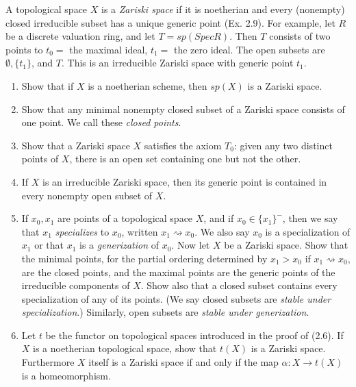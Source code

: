 \begin{exercise}
	A topological space $X$ is a \textit{Zariski space} if it is noetherian and every (nonempty) closed irreducible subset has a unique generic point (Ex. 2.9). For example, let $R$ be a discrete valuation ring, and let $T = sp(Spec R)$. Then $T$ consists of two points to $t_{0} =$ the maximal ideal, $t_1 =$ the zero ideal. The open subsets are $\emptyset, \{t_{1}\}$, and $T$. This is an irreducible Zariski space with generic point $t_1$.
	\begin{enumerate}
		\item Show that if $X$ is a noetherian scheme, then $sp(X)$ is a Zariski space. 
		\item Show that any minimal nonempty closed subset of a Zariski space consists of one point. We call these \textit{closed points}.
		\item Show that a Zariski space $X$ satisfies the axiom $T_0$: given any two distinct points of $X$, there is an open set containing one but not the other.
		\item If $X$ is an irreducible Zariski space, then its generic point is contained in every nonempty open subset of $X$. 
		\item If $x_0,x_1$ are points of a topological space $X$, and if $x_0 \in \{x_{1}\}^-$, then we say that $x_{1}$ \textit{specializes} to $x_0$, written $x_{1} \rightsquigarrow x_{0}$. We also say $x_0$ is a specialization of $x_{1}$ or that $x_{1} $ is a \textit{generization} of $x_{0}$. Now let $X$ be a Zariski space. Show that the minimal points, for the partial ordering determined by $x_{1} > x_{0}$ if $x_{1} \rightsquigarrow x_{0}$, are the closed points, and the maximal points are the generic points of the irreducible components of $X$. Show also that a closed subset contains every specialization of any of its points. (We say closed subsets are \textit{stable under specialization}.) Similarly, open subsets are \textit{stable under generization}.
		\item Let $t$ be the functor on topological spaces introduced in the proof of (2.6). If $X$ is a noetherian topological space, show that $t(X)$ is a Zariski space. Furthermore $X$ itself is a Zariski space if and only if the map $\alpha: X \to t(X)$ is a homeomorphism.
\end{enumerate}
\end{exercise}
